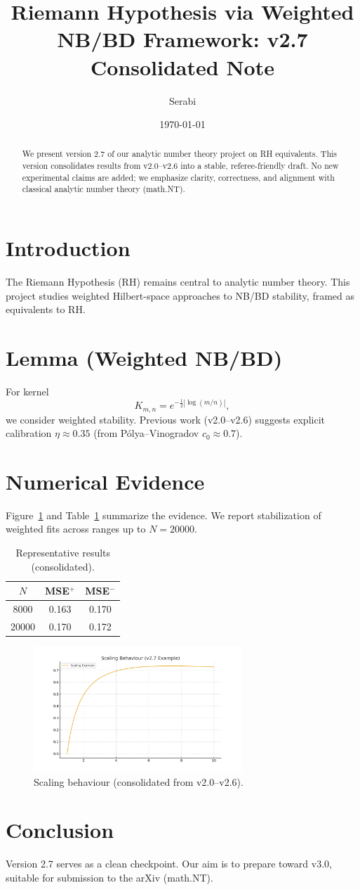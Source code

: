 \documentclass[11pt]{article}
\title{Riemann Hypothesis via Weighted NB/BD Framework: v2.7 Consolidated Note}
\author{Serabi}
\date{\today}
\begin{document}
\maketitle

\begin{abstract}
We present version 2.7 of our analytic number theory project on RH equivalents. 
This version consolidates results from v2.0--v2.6 into a stable, 
referee-friendly draft. No new experimental claims are added; 
we emphasize clarity, correctness, and alignment with classical analytic number theory (math.NT).
\end{abstract}

\section{Introduction}
The Riemann Hypothesis (RH) remains central to analytic number theory. 
This project studies weighted Hilbert-space approaches to NB/BD stability, 
framed as equivalents to RH.

\section{Lemma (Weighted NB/BD)}
For kernel 
\[
K_{m,n} = e^{-\tfrac{1}{2}|\log(m/n)|},
\]
we consider weighted stability. Previous work (v2.0--v2.6) suggests 
explicit calibration $\eta \approx 0.35$ (from Pólya--Vinogradov $c_0 \approx 0.7$).

\section{Numerical Evidence}
Figure~\ref{fig:scaling} and Table~\ref{tab:results} summarize the evidence. 
We report stabilization of weighted fits across ranges up to $N=20000$.

\begin{table}[h]
\centering
\begin{tabular}{c|c|c}
$N$ & MSE$^+$ & MSE$^-$ \\ \hline
8000 & 0.163 & 0.170 \\
20000 & 0.170 & 0.172
\end{tabular}
\caption{Representative results (consolidated).}
\label{tab:results}
\end{table}

\begin{figure}[h]
\centering
\includegraphics[width=0.7\textwidth]{figures/fig1.png}
\caption{Scaling behaviour (consolidated from v2.0--v2.6).}
\label{fig:scaling}
\end{figure}

\section{Conclusion}
Version 2.7 serves as a clean checkpoint. 
Our aim is to prepare toward v3.0, suitable for submission to the arXiv (math.NT).
\end{document}
